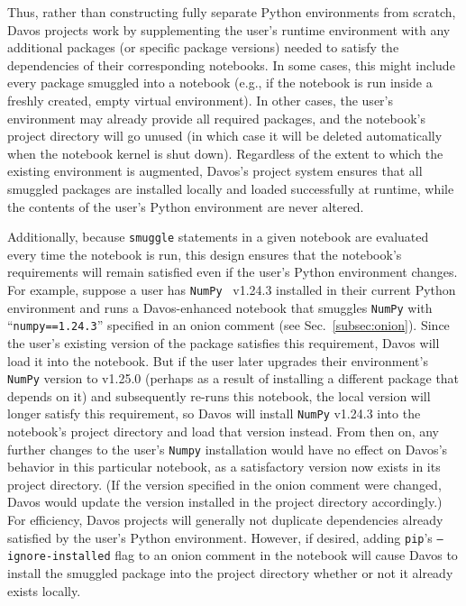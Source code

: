 \documentclass[preprint,12pt,a4paper]{elsarticle}
\begin{document}
Thus, rather than constructing fully separate Python environments from scratch, Davos projects work by supplementing the user's runtime environment with any additional packages (or specific package versions) needed to satisfy the dependencies of their corresponding notebooks.
In some cases, this might include every package smuggled into a notebook (e.g., if the notebook is run inside a freshly created, empty virtual environment).
In other cases, the user's environment may already provide all required packages, and the notebook's project directory will go unused (in which case it will be deleted automatically when the notebook kernel is shut down).
Regardless of the extent to which the existing environment is augmented, Davos's project system ensures that all smuggled packages are installed locally and loaded successfully at runtime, while the contents of the user's Python environment are never altered.

Additionally, because \texttt{smuggle} statements in a given notebook are evaluated every time the notebook is run, this design ensures that the notebook's requirements will remain satisfied even if the user's Python environment changes.
For example, suppose a user has \texttt{NumPy}~\cite{HarrEtal20} v1.24.3 installed in their current Python environment and runs a Davos-enhanced notebook that smuggles \texttt{NumPy} with ``\texttt{numpy==1.24.3}'' specified in an onion comment (see Sec.~\ref{subsec:onion}).
Since the user's existing version of the package satisfies this requirement, Davos will load it into the notebook.
But if the user later upgrades their environment's \texttt{NumPy} version to v1.25.0 (perhaps as a result of installing a different package that depends on it) and subsequently re-runs this notebook, the local version will longer satisfy this requirement, so Davos will install \texttt{NumPy} v1.24.3 into the notebook's project directory and load that version instead.
From then on, any further changes to the user's \texttt{Numpy} installation would have no effect on Davos's behavior in this particular notebook, as a satisfactory version now exists in its project directory.
(If the version specified in the onion comment were changed, Davos would update the version installed in the project directory accordingly.)
For efficiency, Davos projects will generally not duplicate dependencies already satisfied by the user's Python environment.
However, if desired, adding \texttt{pip}'s \texttt{--ignore-installed} flag to an onion comment in the notebook will cause Davos to install the smuggled package into the project directory whether or not it already exists locally.
\end{document}
